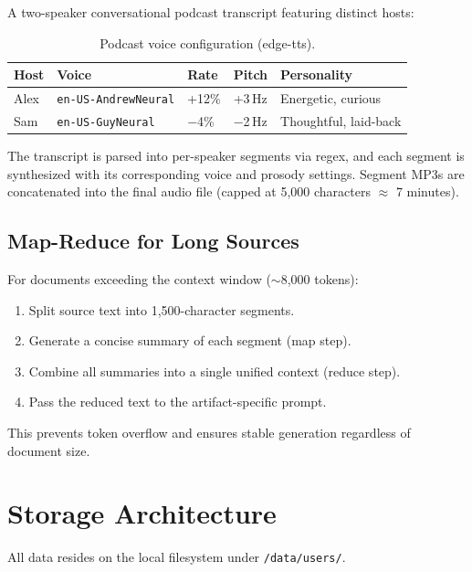 \documentclass[11pt, letterpaper]{article}
\begin{document}
A two-speaker conversational podcast transcript featuring distinct hosts:

\begin{table}[H]
\centering\small
\begin{tabularx}{\textwidth}{@{}l l l l l@{}}
\toprule
\textbf{Host} & \textbf{Voice} & \textbf{Rate} & \textbf{Pitch} & \textbf{Personality} \\
\midrule
Alex & \texttt{en-US-AndrewNeural} & +12\% & +3\,Hz & Energetic, curious \\
Sam  & \texttt{en-US-GuyNeural}    & $-$4\% & $-$2\,Hz & Thoughtful, laid-back \\
\bottomrule
\end{tabularx}
\caption{Podcast voice configuration (edge-tts).}
\end{table}

The transcript is parsed into per-speaker segments via regex, and each segment
is synthesized with its corresponding voice and prosody settings.  Segment MP3s
are concatenated into the final audio file (capped at 5,000 characters
$\approx$ 7 minutes).

\subsection{Map-Reduce for Long Sources}

For documents exceeding the context window (${\sim}$8,000 tokens):

\begin{enumerate}
    \item Split source text into 1,500-character segments.
    \item Generate a concise summary of each segment (map step).
    \item Combine all summaries into a single unified context (reduce step).
    \item Pass the reduced text to the artifact-specific prompt.
\end{enumerate}

This prevents token overflow and ensures stable generation regardless of
document size.

\section{Storage Architecture}

All data resides on the local filesystem under \texttt{/data/users/}.
\end{document}
